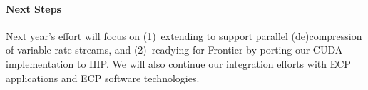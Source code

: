 \paragraph{Next Steps}

Next year's effort will focus on (1)~extending {\zfp} to support parallel (de)compression of variable-rate streams,
and (2)~readying {\zfp} for Frontier by porting our CUDA implementation to HIP.
We will also continue our integration efforts with ECP applications and ECP software technologies.
